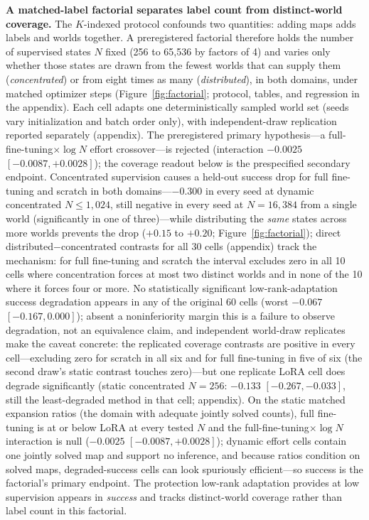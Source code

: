 \documentclass[letterpaper]{article} %
\begin{document}
\textbf{A matched-label factorial separates label count from distinct-world coverage.} The $K$-indexed protocol confounds two quantities: adding maps adds labels and worlds together. A preregistered factorial therefore holds the number of supervised states $N$ fixed (256 to 65{,}536 by factors of 4) and varies only whether those states are drawn from the fewest worlds that can supply them (\emph{concentrated}) or from eight times as many (\emph{distributed}), in both domains, under matched optimizer steps (Figure~\ref{fig:factorial}; protocol, tables, and regression in the appendix). Each cell adapts one deterministically sampled world set (seeds vary initialization and batch order only), with independent-draw replication reported separately (appendix). The preregistered primary hypothesis---a full-fine-tuning$\times\log N$ effort crossover---is rejected (interaction $-0.0025$ $[-0.0087, +0.0028]$); the coverage readout below is the prespecified secondary endpoint. Concentrated supervision causes a held-out success drop for full fine-tuning and scratch in both domains---$-0.300$ in every seed at dynamic concentrated $N \leq 1{,}024$, still negative in every seed at $N{=}16{,}384$ from a single world (significantly in one of three)---while distributing the \emph{same} states across more worlds prevents the drop ($+0.15$ to $+0.20$; Figure~\ref{fig:factorial}); direct distributed$-$concentrated contrasts for all 30 cells (appendix) track the mechanism: for full fine-tuning and scratch the interval excludes zero in all 10 cells where concentration forces at most two distinct worlds and in none of the 10 where it forces four or more. No statistically significant low-rank-adaptation success degradation appears in any of the original 60 cells (worst $-0.067$ $[-0.167, 0.000]$); absent a noninferiority margin this is a failure to observe degradation, not an equivalence claim, and independent world-draw replicates make the caveat concrete: the replicated coverage contrasts are positive in every cell---excluding zero for scratch in all six and for full fine-tuning in five of six (the second draw's static contrast touches zero)---but one replicate LoRA cell does degrade significantly (static concentrated $N{=}256$: $-0.133$ $[-0.267, -0.033]$, still the least-degraded method in that cell; appendix). On the static matched expansion ratios (the domain with adequate jointly solved counts), full fine-tuning is at or below LoRA at every tested $N$ and the full-fine-tuning$\times\log N$ interaction is null ($-0.0025$ $[-0.0087, +0.0028]$); dynamic effort cells contain one jointly solved map and support no inference, and because ratios condition on solved maps, degraded-success cells can look spuriously efficient---so success is the factorial's primary endpoint. The protection low-rank adaptation provides at low supervision appears in \emph{success} and tracks distinct-world coverage rather than label count in this factorial.
\end{document}
